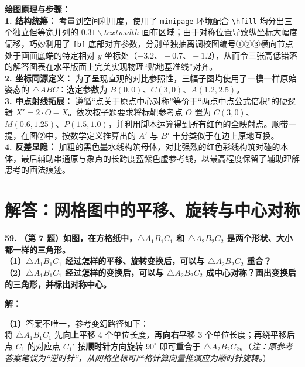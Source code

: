 \vspace{0.4cm}
{\small\color{blue!70!black}
\textbf{绘图原理与步骤：}\\
\textbf{1. 结构统筹：} 考量到空间利用度，使用了 \texttt{minipage} 环境配合 \texttt{\textbackslash{}hfill} 均分出三个独立但等宽并列的 $0.31\backslash{}textwidth$ 画布区域；由于对称位置导致纵坐标大幅度偏移，巧妙利用了 \texttt{[b]} 底部对齐参数，分别单独抽离调校图编号①②③横向节点处于画面底端的特定相对 $y$ 坐标处（$-3.2、-0.7、-1.2$），从而令三张高低错落的解答图表在水平版面上完美实现物理“贴地基准线”对齐。\\
\textbf{2. 坐标同源定义：} 为了呈现直观的对比参照性，三幅子图均使用了一模一样原始姿态的 $\triangle ABC$：选定参数为 $B(0,0)$、$C(3,0)、A(1.2, 2.5)$。\\
\textbf{3. 中点射线拓展：} 遵循“点关于原点中心对称”等价于“两点中点公式倍积”的硬逻辑 $X'=2 \cdot O-X$。依次按子题要求将标靶参考点 $O$ 置为 $C(3,0)$、$M(0.6, 1.25)、P(1.5, 1.0)$，并利用脚本运算得到所有红色的全映射点。顺带一提，在图②中，按数学定义推算出的 $A'$ 与 $B'$ 十分类似于在边上原地互换。\\
\textbf{4. 反差显隐：} 加粗的黑色墨水线构筑母体，对比强烈的红色彩线构筑对碰的本体，最后辅助串通原与象点的长跨度蓝紫色虚参考线，以最高程度保留了辅助理解思考的画法痕迹。
}

\newpage



\section{解答：网格图中的平移、旋转与中心对称}

\vspace{0.6cm}

\textbf{\LARGE 59.} \textbf{（第 7 题）如图，在方格纸中，$\triangle A_1B_1C_1$ 和 $\triangle A_2B_2C_2$ 是两个形状、大小都一样的三角形。\\
（1）$\triangle A_1B_1C_1$ 经过怎样的平移、旋转变换后，可以与 $\triangle A_2B_2C_2$ 重合？\\
（2）$\triangle A_1B_1C_1$ 经过怎样的变换后，可以与 $\triangle A_2B_2C_2$ 成中心对称？画出变换后的三角形，并标出对称中心。}

\vspace{0.4cm}
\textbf{解：}

\textbf{（1）}答案不唯一，参考变幻路径如下：\\
将 $\triangle A_1B_1C_1$ 先\textbf{向上}平移 $4$ 个单位长度，再\textbf{向右}平移 $3$ 个单位长度；再绕平移后点 $C_1$ 的对应点 $C_1'$ 按\textbf{顺时针}方向旋转 $90^\circ$ 即可重合于 $\triangle A_2B_2C_2$。（\textit{注：原参考答案笔误为“逆时针”，从网格坐标可严格计算向量推演应为顺时针旋转。}）

